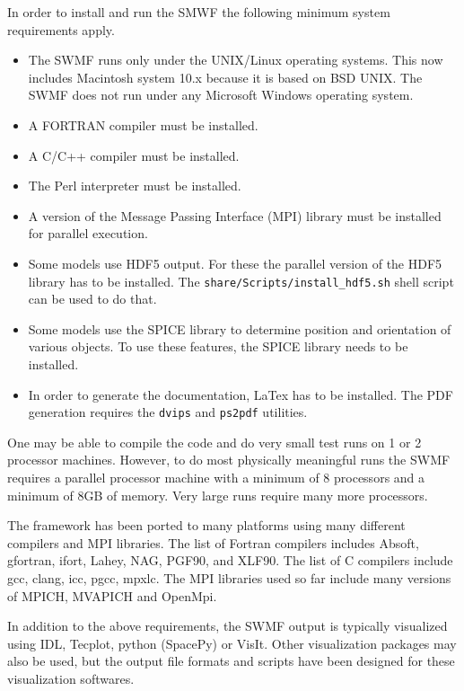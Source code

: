 In order to install and run the SMWF the following minimum system
requirements apply.
\begin{itemize}
\item The SWMF runs only under the UNIX/Linux operating systems.  This now
  includes Macintosh system 10.x because it is based on BSD UNIX.  The
  SWMF does not run under any Microsoft Windows operating system.
\item A FORTRAN compiler must be installed.
\item A C/C++ compiler must be installed.
\item The Perl interpreter must be installed.
\item A version of the Message Passing Interface (MPI) library must be
  installed for parallel execution.
\item Some models use HDF5 output. For these the parallel version of 
  the HDF5 library has to be installed. The {\tt share/Scripts/install\_hdf5.sh}
  shell script can be used to do that.
\item Some models use the SPICE library to determine position and 
  orientation of various objects. To use these features, the SPICE
  library needs to be installed.
\item In order to generate the documentation, LaTex has to be installed.
  The PDF generation requires the {\tt dvips} and {\tt ps2pdf}
  utilities. 
\end{itemize}
One may be able to compile the code and do very small test
runs on 1 or 2 processor machines.  However, to do most physically
meaningful runs the SWMF requires a parallel processor machine with a 
minimum of 8 processors and a minimum of 8GB of memory.
Very large runs require many more processors.

The framework has been ported to many platforms using many different
compilers and MPI libraries. The list of Fortran compilers includes
Absoft, gfortran, ifort, Lahey, NAG, PGF90, and XLF90.
The list of C compilers include gcc, clang, icc, pgcc, mpxlc.
The MPI libraries used so far include many versions of MPICH, MVAPICH and 
OpenMpi. 

In addition to the above requirements, the SWMF output is typically
visualized using IDL, Tecplot, python (SpacePy) or VisIt. 
Other visualization packages may also be used, but the output file
formats and scripts have been designed for these visualization softwares.


